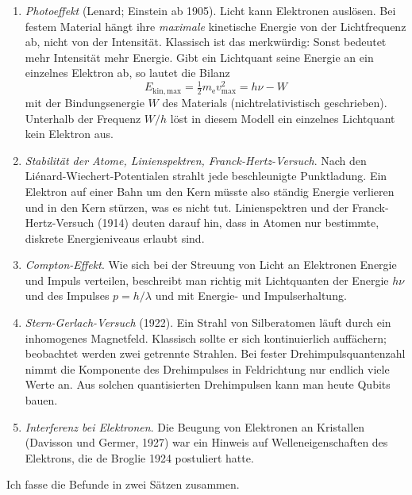 \begin{enumerate}
\begin{equation*}
	\end{equation*}
	\item \emph{Photoeffekt} (Lenard; Einstein ab 1905). Licht kann Elektronen auslösen. Bei festem Material hängt ihre \emph{maximale} kinetische Energie von der Lichtfrequenz ab, nicht von der Intensität. Klassisch ist das merkwürdig: Sonst bedeutet mehr Intensität mehr Energie. Gibt ein Lichtquant seine Energie an ein einzelnes Elektron ab, so lautet die Bilanz
	\begin{equation*}
		E_{\mathrm{kin,max}} = \tfrac12 m_{\mathrm{e}} v_{\max}^2 = h\nu - W
	\end{equation*}
	mit der Bindungsenergie $W$ des Materials (nichtrelativistisch geschrieben). Unterhalb der Frequenz $W/h$ löst in diesem Modell ein einzelnes Lichtquant kein Elektron aus.
	\item \emph{Stabilität der Atome, Linienspektren, Franck-Hertz-Versuch}. Nach den Liénard-Wiechert-Potentialen strahlt jede beschleunigte Punktladung. Ein Elektron auf einer Bahn um den Kern müsste also ständig Energie verlieren und in den Kern stürzen, was es nicht tut. Linienspektren und der Franck-Hertz-Versuch (1914) deuten darauf hin, dass in Atomen nur bestimmte, diskrete Energieniveaus erlaubt sind.
	\item \emph{Compton-Effekt}. Wie sich bei der Streuung von Licht an Elektronen Energie und Impuls verteilen, beschreibt man richtig mit Lichtquanten der Energie $h\nu$ und des Impulses $p = h/\lambda$ und mit Energie- und Impulserhaltung.
	\item \emph{Stern-Gerlach-Versuch} (1922). Ein Strahl von Silberatomen läuft durch ein inhomogenes Magnetfeld. Klassisch sollte er sich kontinuierlich auffächern; beobachtet werden zwei getrennte Strahlen. Bei fester Drehimpulsquantenzahl nimmt die Komponente des Drehimpulses in Feldrichtung nur endlich viele Werte an. Aus solchen quantisierten Drehimpulsen kann man heute Qubits bauen.
	\item \emph{Interferenz bei Elektronen}. Die Beugung von Elektronen an Kristallen (Davisson und Germer, 1927) war ein Hinweis auf Welleneigenschaften des Elektrons, die de Broglie 1924 postuliert hatte.
\end{enumerate}
Ich fasse die Befunde in zwei Sätzen zusammen.

